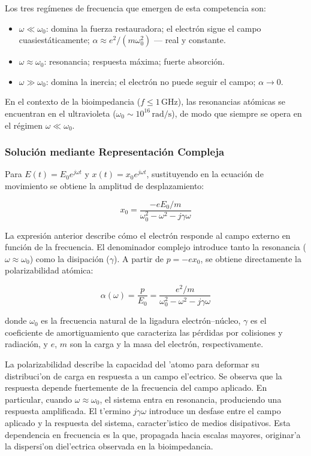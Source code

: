 \documentclass[12pt]{article}
\begin{document}
Los tres reg\'imenes de frecuencia que emergen de esta competencia son:

\begin{itemize}
\item $\omega \ll \omega_0$: domina la fuerza restauradora; el electr\'on sigue el campo
cuasiestáticamente; $\alpha \approx e^2/(m\omega_0^2)$ --- real y constante.
\item $\omega \approx \omega_0$: resonancia; respuesta m\'axima; fuerte absorci\'on.
\item $\omega \gg \omega_0$: domina la inercia; el electr\'on no puede seguir el campo;
$\alpha \to 0$.
\end{itemize}

En el contexto de la bioimpedancia ($f \leq 1\,\text{GHz}$), las resonancias at\'omicas se
encuentran en el ultravioleta ($\omega_0 \sim 10^{16}\,\text{rad/s}$), de modo que siempre se
opera en el r\'egimen $\omega \ll \omega_0$.

\subsubsection{Soluci\'on mediante Representaci\'on Compleja}

Para $E(t) = E_0 e^{j\omega t}$ y $x(t) = x_0 e^{j\omega t}$, sustituyendo en la ecuaci\'on de
movimiento se obtiene la amplitud de desplazamiento:

\begin{equation}
x_0 = \frac{-eE_0/m}{\omega_0^2 - \omega^2 - j\gamma\omega}
\end{equation}

La expresi\'on anterior describe c\'omo el electr\'on responde al campo externo en funci\'on de la
frecuencia. El denominador complejo introduce tanto la resonancia ($\omega \approx
\omega_0$) como la disipaci\'on ($\gamma$). A partir de $p = -ex_0$, se obtiene directamente la
polarizabilidad at\'omica:

\begin{equation}
\boxed{
\alpha(\omega) = \frac{p}{E_0} = \frac{e^2/m}{\omega_0^2 - \omega^2 - j\gamma\omega}
}
\label{eq:alpha}
\end{equation}

donde $\omega_0$ es la frecuencia natural de la ligadura electr\'on--n\'ucleo, $\gamma$ es el
coeficiente de amortiguamiento que caracteriza las p\'erdidas por colisiones y radiaci\'on, y $e$,
$m$ son la carga y la masa del electr\'on, respectivamente.

La polarizabilidad describe la capacidad del 'atomo para deformar su
distribuci'on de carga en respuesta a un campo el'ectrico. Se observa que la
respuesta depende fuertemente de la frecuencia del campo aplicado. En particular,
cuando $\omega \approx \omega_0$, el sistema entra en resonancia, produciendo
una respuesta amplificada. El t'ermino $j\gamma\omega$ introduce un desfase
entre el campo aplicado y la respuesta del sistema, caracter'istico de medios
disipativos. Esta dependencia en frecuencia es la que, propagada hacia escalas
mayores, originar'a la dispersi'on diel'ectrica observada en la bioimpedancia.
\end{document}
